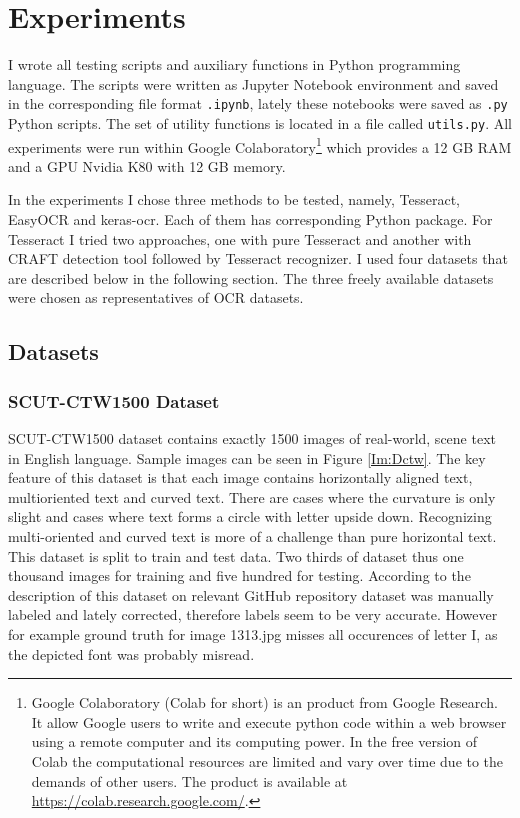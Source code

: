 \chapter{Experiments}
\label{ch:testing}
I wrote all testing scripts and auxiliary functions in Python programming language. The scripts were written as Jupyter Notebook environment and saved in the corresponding file format \texttt{.ipynb}, lately these notebooks were saved as \texttt{.py} Python scripts. The set of utility functions is located in a file called \texttt{utils.py}. All experiments were run within Google Colaboratory\footnote{Google Colaboratory (Colab for short) is an product from Google Research. It allow Google users to write and execute python code within a web browser using a remote computer and its computing power. In the free version of Colab the computational resources are limited and vary over time due to the demands of other users. The product is available at \url{https://colab.research.google.com/}.} which provides a 12 GB RAM and a GPU Nvidia K80 with 12 GB memory.

In the experiments I chose three methods to be tested, namely, Tesseract, EasyOCR and keras-ocr. Each of them has corresponding Python package. For Tesseract I tried two approaches, one with pure Tesseract and another with CRAFT detection tool followed by Tesseract recognizer. I used four datasets that are described below in the following section. The three freely available datasets were chosen as representatives of OCR datasets.

\section{Datasets}
\label{sec:expDatasets}

\subsection{SCUT-CTW1500 Dataset}

SCUT-CTW1500 dataset contains exactly 1500 images of real-world, scene text in English language. Sample images can be seen in Figure \ref*{Im:Dctw}. The key feature of this dataset is that each image contains horizontally aligned text, multioriented text and curved text. There are cases where the curvature is only slight and cases where text forms a circle with letter upside down. Recognizing multi-oriented and curved text is more of a challenge than pure horizontal text. This dataset is split to train and test data. Two thirds of dataset thus one thousand images for training and five hundred for testing. According to the description of this dataset on relevant GitHub repository dataset was manually labeled and lately corrected, therefore labels seem to be very accurate. However for example ground truth for image 1313.jpg misses all occurences of letter I, as the depicted font was probably misread.\cite{ctw,ctw2}

